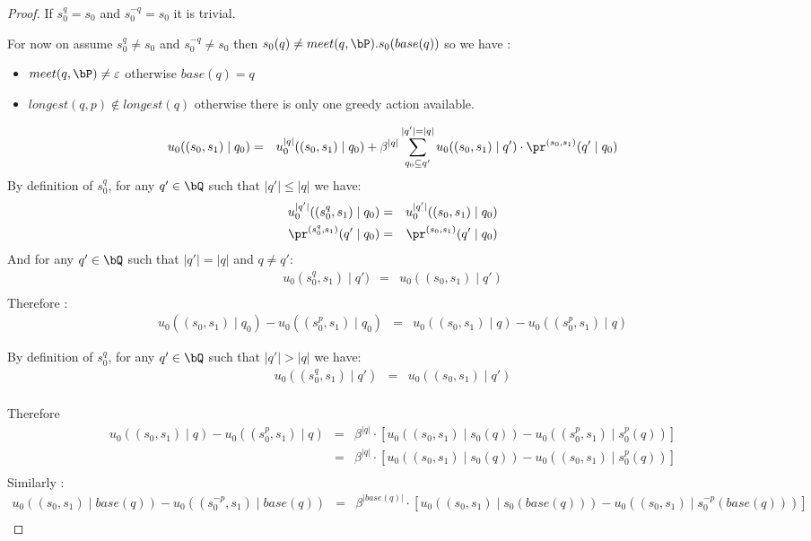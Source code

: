 \begin{proof}
	
	If $s^q_0 = s_0$ and  $s^{-q}_0 = s_0$ it is trivial.
	
	For now on assume $s^q_0 \neq s_0$ and $s^{-q}_0 \neq s_0$ then $s_0(q) \neq meet(q,\bP) . s_0(base(q))$ so we have :
	\begin{itemize}
		\item $meet(q,\bP) \neq \varepsilon$ otherwise $base(q) = q$
		\item $longest(q,p) \notin longest(q)$ otherwise there is only one greedy action available.
	\end{itemize}

\begin{eqnarray*}
	u_0((s_0,s_1) \mid q_0)  & = & u_0^{|q|}((s_0,s_1) \mid q_0) + \beta^{|q|} \sum_{q_0 \subseteq q'}^{|q'|=|q|} u_0((s_0,s_1) \mid q') \cdot \pr^{(s_0,s_1)}(q' \mid q_0) \\
\end{eqnarray*}
By definition of $s^{q}_0$, for any $q'\in \bQ$ such that $|q'| \leq |q|$ we have:
\begin{eqnarray*}
	u_0^{|q'|}((s^{q}_0,s_1) \mid q_0) & = & u_0^{|q'|}((s_0,s_1) \mid q_0) \\ 
	\pr^{(s^{q}_0,s_1)}(q' \mid q_0) & = & \pr^{(s_0,s_1)}(q' \mid q_0)
\end{eqnarray*}
And for any $q'\in \bQ$ such that $|q'| = |q|$ and $q \neq q'$:
\begin{eqnarray*}
	u_0(s^{q}_0,s_1) \mid q') & = & u_0((s_0,s_1) \mid q') \\ 
\end{eqnarray*}
Therefore : 
\begin{eqnarray*}
	u_0((s_0,s_1) \mid q_0) -  u_0((s^p_0,s_1) \mid q_0) & = & u_0((s_0,s_1) \mid q) -  u_0((s^p_0,s_1) \mid q)
\end{eqnarray*}

By definition of $s^{q}_0$, for any $q'\in \bQ$ such that $|q'| > |q|$ we have:
\begin{eqnarray*}
	u_0((s^{q}_0,s_1) \mid q') & = & u_0((s_0,s_1) \mid q') \\ 
\end{eqnarray*}

Therefore
\begin{eqnarray*}
	u_0((s_0,s_1) \mid q) -  u_0((s^p_0,s_1) \mid q) & = & \beta^{|q|} \cdot [u_0((s_0,s_1) \mid s_0(q)) - u_0((s^p_0,s_1) \mid s^p_0(q))] \\ 
	& = & \beta^{|q|}\cdot [u_0((s_0,s_1) \mid s_0(q)) - u_0((s_0,s_1) \mid s^p_0(q))] \\ 
\end{eqnarray*}
Similarly : 
\begin{eqnarray*}
	u_0((s_0,s_1) \mid base(q)) -  u_0((s^{-p}_0,s_1) \mid base(q)) 
	& = & \beta^{|base(q)|} \cdot[ u_0((s_0,s_1) \mid s_0(base(q))) - u_0((s_0,s_1) \mid s^{-p}_0(base(q)))] \\ 
\end{eqnarray*}



\end{proof}

